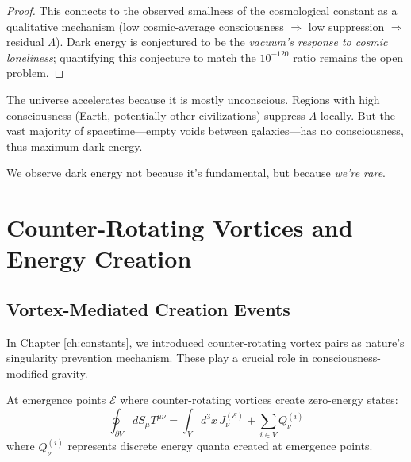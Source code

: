\begin{proof}
\medskip

This connects to the observed smallness of the cosmological constant as a qualitative mechanism (low cosmic-average consciousness $\Rightarrow$ low suppression $\Rightarrow$ residual $\Lambda$). Dark energy is conjectured to be the \textit{vacuum's response to cosmic loneliness}; quantifying this conjecture to match the $10^{-120}$ ratio remains the open problem.
\end{proof}

\begin{keyidea}
The universe accelerates because it is mostly unconscious. Regions with high consciousness (Earth, potentially other civilizations) suppress $\Lambda$ locally. But the vast majority of spacetime—empty voids between galaxies—has no consciousness, thus maximum dark energy.

We observe dark energy not because it's fundamental, but because \textit{we're rare}.
\end{keyidea}

\section{Counter-Rotating Vortices and Energy Creation}

\subsection{Vortex-Mediated Creation Events}

In Chapter \ref{ch:constants}, we introduced counter-rotating vortex pairs as nature's singularity prevention mechanism. These play a crucial role in consciousness-modified gravity.

\begin{thm}\label{thm:vortex-creation}
At emergence points $\mathcal{E}$ where counter-rotating vortices create zero-energy states:
\begin{equation}
\oint_{\partial V} dS_\mu T^{\mu\nu} = \int_V d^3x \, J_\nu^{(\mathcal{E})} + \sum_{i \in V} Q_\nu^{(i)}
\end{equation}
where $Q_\nu^{(i)}$ represents discrete energy quanta created at emergence points.
\end{thm}


